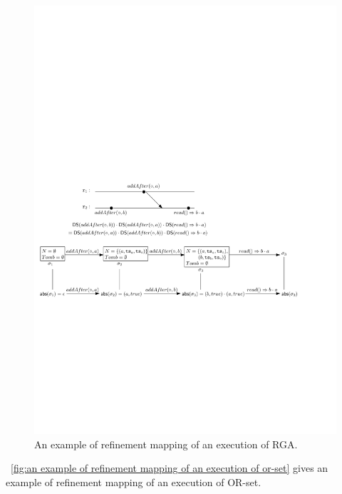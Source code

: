 \begin{figure}[t]
  \centering
  \includegraphics[width=0.85 \textwidth]{figures/RefinementMappingRGA.pdf}
\vspace{-10pt}
  \caption{An example of refinement mapping of an execution of RGA.}
  \label{fig:an example of refinement mapping of an execution of RGA}
\end{figure}



\figurename~\ref{fig:an example of refinement mapping of an execution of or-set} gives an example of refinement mapping of an execution of OR-set.

